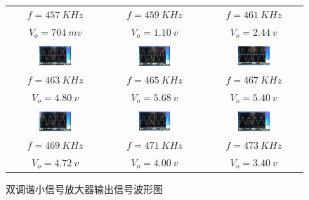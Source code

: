 \documentclass[12pt]{article}%
\numberwithin{equation}{section}
\begin{document}
\begin{enumerate}
\begin{figure}[htbp]
\begin{tabular}{ccc}
$f=457\ KHz$ & $f=459\ KHz$ & $f=461\ KHz$ \\
$V_o=704\ mv$ & $V_o=1.10\ v$ & $V_o=2.44\ v$ \\
\\
 \includegraphics[width=0.35\textwidth]{gaopin2/gaopin210.jpg} &\includegraphics[width=0.35\textwidth]{gaopin2/gaopin216.jpg}&\includegraphics[width=0.35\textwidth]{gaopin2/gaopin211.jpg} \\ 
$f=463\ KHz$ & $f=465\ KHz$ & $f=467\ KHz$ \\
$V_o=4.80\ v$ & $V_o=5.68\ v$ & $V_o=5.40\ v$ \\
\\
 \includegraphics[width=0.35\textwidth]{gaopin2/gaopin207.jpg} &\includegraphics[width=0.35\textwidth]{gaopin2/gaopin205.jpg}&\includegraphics[width=0.35\textwidth]{gaopin2/gaopin203.jpg} \\ 
$f=469\ KHz$ & $f=471\ KHz$ & $f=473\ KHz$ \\
$V_o=4.72\ v$ & $V_o=4.00\ v$ & $V_o=3.40\ v$ \\
\end{tabular}
\caption{双调谐小信号放大器输出信号波形图}\label{img:122}
\end{figure}
\end{enumerate}
\end{document}
